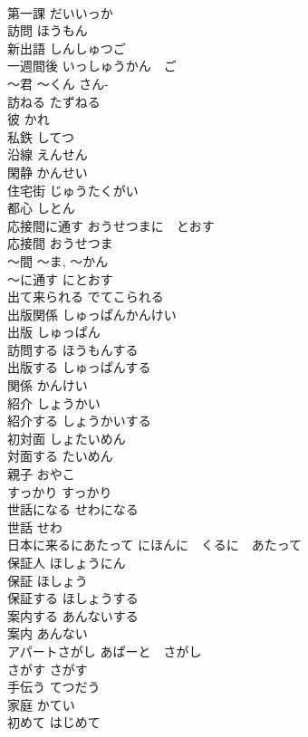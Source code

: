 \documentclass[8pt]{extreport}
\begin{document}
\begin{CJK}{UTF8}{min}
\\	第一課	だいいっか	
\\	訪問	ほうもん	
\\	新出語	しんしゅつご	
\\	一週間後	いっしゅうかん　ご	
\\	〜君	〜くん	さん-
\\	訪ねる	たずねる	
\\	彼	かれ	
\\	私鉄	してつ	
\\	沿線	えんせん	
\\	閑静	かんせい	
\\	住宅街	じゅうたくがい	
\\	都心	しとん	
\\	応接間に通す	おうせつまに　とおす	
\\	応接間	おうせつま	
\\	〜間	〜ま, 〜かん	
\\	〜に通す	にとおす	
\\	出て来られる	でてこられる	
\\	出版関係	しゅっぱんかんけい	
\\	出版	しゅっぱん	
\\	訪問する	ほうもんする	
\\	出版する	しゅっぱんする	
\\	関係	かんけい	
\\	紹介	しょうかい	
\\	紹介する	しょうかいする	
\\	初対面	しょたいめん	
\\	対面する	たいめん	
\\	親子	おやこ	
\\	すっかり	すっかり	
\\	世話になる	せわになる	
\\	世話	せわ	
\\	日本に来るにあたって	にほんに　くるに　あたって	
\\	保証人	ほしょうにん	
\\	保証	ほしょう	
\\	保証する	ほしょうする	
\\	案内する	あんないする	
\\	案内	あんない	
\\	アパートさがし	あぱーと　さがし	
\\	さがす	さがす	
\\	手伝う	てつだう	
\\	家庭	かてい	
\\	初めて	はじめて	

\end{CJK}
\end{document}
